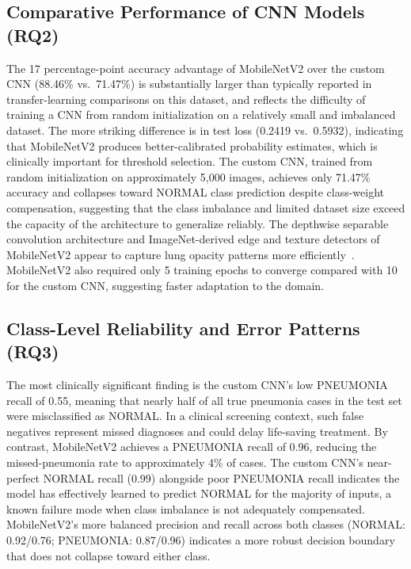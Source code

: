 \documentclass[preprint,12pt]{elsarticle}
\begin{document}
\subsection{Comparative Performance of CNN Models (RQ2)}
The 17 percentage-point accuracy advantage of MobileNetV2 over the
custom CNN (88.46\% vs.\ 71.47\%) is substantially larger than
typically reported in transfer-learning comparisons on this dataset,
and reflects the difficulty of training a CNN from random
initialization on a relatively small and imbalanced dataset.
The more striking difference is in test loss (0.2419 vs.\ 0.5932),
indicating that MobileNetV2 produces better-calibrated probability
estimates, which is clinically important for threshold selection.
The custom CNN, trained from random initialization on approximately
5{,}000 images, achieves only 71.47\% accuracy and collapses toward
NORMAL class prediction despite class-weight compensation, suggesting
that the class imbalance and limited dataset size exceed the capacity
of the architecture to generalize reliably.
The depthwise separable convolution architecture and
ImageNet-derived edge and texture detectors of MobileNetV2 appear
to capture lung opacity patterns more efficiently~\cite{mobilenetv2}.
MobileNetV2 also required only 5 training epochs to converge compared
with 10 for the custom CNN, suggesting faster adaptation to the domain.

\subsection{Class-Level Reliability and Error Patterns (RQ3)}
The most clinically significant finding is the custom CNN's low PNEUMONIA
recall of 0.55, meaning that nearly half of all true pneumonia cases
in the test set were misclassified as NORMAL.
In a clinical screening context, such false negatives represent missed
diagnoses and could delay life-saving treatment.
By contrast, MobileNetV2 achieves a PNEUMONIA recall of 0.96, reducing
the missed-pneumonia rate to approximately 4\% of cases.
The custom CNN's near-perfect NORMAL recall (0.99) alongside poor
PNEUMONIA recall indicates the model has effectively learned to predict
NORMAL for the majority of inputs, a known failure mode when class
imbalance is not adequately compensated.
MobileNetV2's more balanced precision and recall across both classes
(NORMAL: 0.92/0.76; PNEUMONIA: 0.87/0.96) indicates a more robust
decision boundary that does not collapse toward either class.
\end{document}
